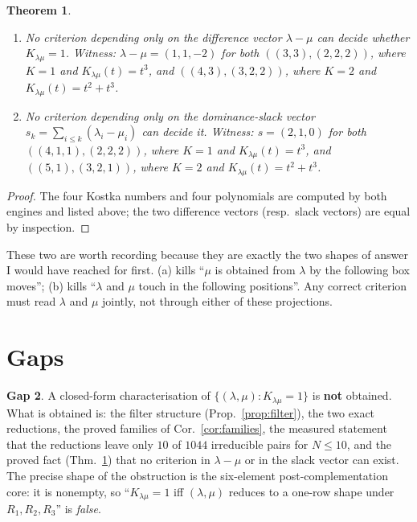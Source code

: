 \documentclass[11pt]{article}
\theoremstyle{plain}
\newtheorem{theorem}{Theorem}
\theoremstyle{definition}
\newtheorem{gap}[theorem]{Gap}
\begin{document}
\begin{theorem}\label{thm:obstruction}
\begin{enumerate}
\item[(a)] No criterion depending only on the difference vector $\lambda-\mu$ can decide
whether $K_{\lambda\mu}=1$.  Witness:
$\lambda-\mu=(1,1,-2)$ for both $((3,3),(2,2,2))$, where $K=1$ and $K_{\lambda\mu}(t)=t^3$,
and $((4,3),(3,2,2))$, where $K=2$ and $K_{\lambda\mu}(t)=t^2+t^3$.
\item[(b)] No criterion depending only on the dominance-slack vector
$s_k=\sum_{i\le k}(\lambda_i-\mu_i)$ can decide it.  Witness: $s=(2,1,0)$ for both
$((4,1,1),(2,2,2))$, where $K=1$ and $K_{\lambda\mu}(t)=t^3$, and $((5,1),(3,2,1))$,
where $K=2$ and $K_{\lambda\mu}(t)=t^2+t^3$.
\end{enumerate}
\end{theorem}
\begin{proof}
The four Kostka numbers and four polynomials are computed by both engines and listed
above; the two difference vectors (resp.\ slack vectors) are equal by inspection.
\end{proof}

These two are worth recording because they are exactly the two shapes of answer I would
have reached for first.  (a) kills ``$\mu$ is obtained from $\lambda$ by the following
box moves''; (b) kills ``$\lambda$ and $\mu$ touch in the following positions''.  Any
correct criterion must read $\lambda$ and $\mu$ jointly, not through either of these
projections.

\section{Gaps}\label{sec:gaps}

\begin{gap}
A closed-form characterisation of $\{(\lambda,\mu):K_{\lambda\mu}=1\}$ is \textbf{not}
obtained.  What is obtained is: the filter structure (Prop.~\ref{prop:filter}), the two
exact reductions, the proved families of Cor.~\ref{cor:families}, the measured statement
that the reductions leave only $10$ of $1044$ irreducible pairs for $N\le10$, and the
proved fact (Thm.~\ref{thm:obstruction}) that no criterion in $\lambda-\mu$ or in the
slack vector can exist.  The precise shape of the obstruction is the six-element
post-complementation core: it is nonempty, so ``$K_{\lambda\mu}=1$ iff $(\lambda,\mu)$
reduces to a one-row shape under $R_1,R_2,R_3$'' is \emph{false}.
\end{gap}
\end{document}
